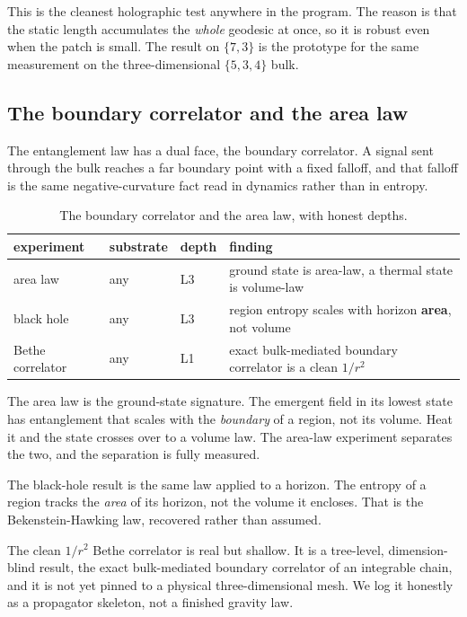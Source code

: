 This is the cleanest holographic test anywhere in the program. The reason is that the static length accumulates the \emph{whole} geodesic at once, so it is robust even when the patch is small. The result on $\{7,3\}$ is the prototype for the same measurement on the three-dimensional $\{5,3,4\}$ bulk.

\subsection{The boundary correlator and the area law}

The entanglement law has a dual face, the boundary correlator. A signal sent through the bulk reaches a far boundary point with a fixed falloff, and that falloff is the same negative-curvature fact read in dynamics rather than in entropy.

\begin{table}[ht]
\centering
\begin{tabular}{@{}llll@{}}
\toprule
experiment & substrate & depth & finding \\
\midrule
area law & any & L3 & ground state is area-law, a thermal state is volume-law \\
black hole & any & L3 & region entropy scales with horizon \textbf{area}, not volume \\
Bethe correlator & any & L1 & exact bulk-mediated boundary correlator is a clean $1/r^2$ \\
\bottomrule
\end{tabular}
\caption{The boundary correlator and the area law, with honest depths.}
\label{tab:hol-correlator}
\end{table}

The area law is the ground-state signature. The emergent field in its lowest state has entanglement that scales with the \emph{boundary} of a region, not its volume. Heat it and the state crosses over to a volume law. The area-law experiment separates the two, and the separation is fully measured.

The black-hole result is the same law applied to a horizon. The entropy of a region tracks the \emph{area} of its horizon, not the volume it encloses. That is the Bekenstein-Hawking law, recovered rather than assumed.

The clean $1/r^2$ Bethe correlator is real but shallow. It is a tree-level, dimension-blind result, the exact bulk-mediated boundary correlator of an integrable chain, and it is not yet pinned to a physical three-dimensional mesh. We log it honestly as a propagator skeleton, not a finished gravity law.

